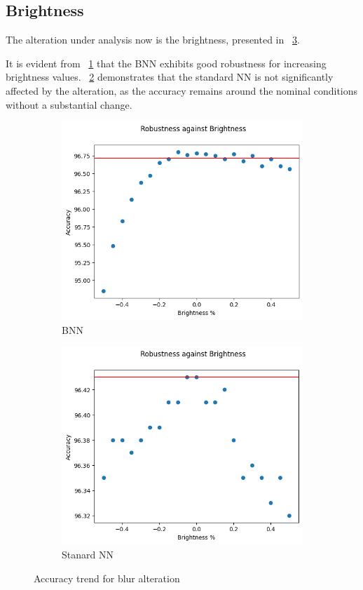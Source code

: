 \subsection{Brightness}

The alteration under analysis now is the brightness, presented in \Fig~\ref{fig:acc_br_wu}.

It is evident from \Fig~\ref{fig:br_acc_wu_bnn} that the BNN exhibits good robustness for increasing brightness values. \Fig~\ref{fig:brightness_ann} demonstrates that the standard NN is not significantly affected by the alteration, as the accuracy remains around the nominal conditions without a substantial change.

\begin{figure}[h]
	\centering
	\begin{subfigure}{.5\textwidth}
		\centering
		\includegraphics[width=0.9\linewidth]{ImageFiles/EvalBNN/BR/WU/acc}
		\caption{BNN}
		\label{fig:br_acc_wu_bnn}
	\end{subfigure}%
	\begin{subfigure}{.5\textwidth}
		\centering
		\includegraphics[width=0.9\linewidth]{ImageFiles/EvalANN/brightness_ann}
		\caption{Stanard NN}
		\label{fig:brightness_ann}
	\end{subfigure}
	\caption{Accuracy trend for blur alteration}
	\label{fig:acc_br_wu}
\end{figure}

